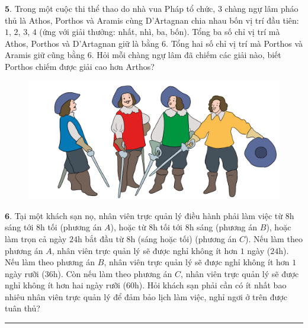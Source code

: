 \begin{multicols}{2}
\begin{figure}[H]
		\vspace*{-10pt}
	\end{figure}
	$\pmb{5.}$ Trong một cuộc thi thể thao do nhà vua Pháp tổ chức, $3$ chàng ngự lâm pháo thủ là Athos, Porthos và Aramis cùng D'Artagnan chia nhau bốn vị trí đầu tiên: $1$, $2$, $3$, $4$ (ứng với giải thưởng: nhất, nhì, ba, bốn). Tổng ba số chỉ vị trí mà Athos, Porthos và D'Artagnan giữ là bằng $6$. Tổng hai số chỉ vị trí mà Porthos và Aramis giữ cũng bằng $6$. Hỏi mỗi chàng ngự lâm đã chiếm các giải nào, biết Porthos chiếm được giải cao hơn Arthos?
	\begin{figure}[H]
		\centering
		\vspace*{-5pt}
		\captionsetup{labelformat= empty, justification=centering}
		\includegraphics[width=1\linewidth]{Pi3_bai5}
		\vspace*{-15pt}
	\end{figure}
	$\pmb{6.}$ Tại một khách sạn nọ, nhân viên trực quản lý điều hành phải làm việc từ $8$h sáng tới $8$h tối (phương án $A$), hoặc từ $8$h tối tới $8$h sáng (phương án $B$), hoặc làm trọn cả ngày $24$h bắt đầu từ $8$h (sáng hoặc tối) (phương án $C$). Nếu làm theo phương án $A$, nhân viên trực quản lý sẽ được nghỉ không ít hơn $1$ ngày ($24$h). Nếu làm theo phương án $B$, nhân viên trực quản lý sẽ được nghỉ không ít hơn $1$ ngày rưỡi ($36$h). Còn nếu làm theo phương án $C$, nhân viên trực quản lý sẽ được nghỉ không ít hơn hai ngày rưỡi ($60$h).
	\vskip 0.1cm
	Hỏi khách sạn phải cần có ít nhất bao nhiêu nhân viên trực quản lý để đảm bảo lịch làm việc, nghỉ ngơi ở trên được tuân thủ?
\end{multicols}
\vspace*{-10pt}
{\color{toancuabi}\rule{1\linewidth}{0.1pt}}
\begingroup

